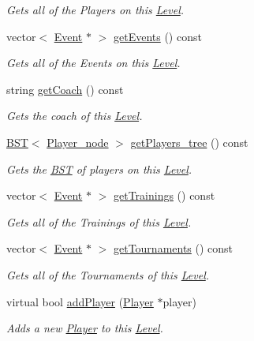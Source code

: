 \begin{DoxyCompactItemize}
\begin{DoxyCompactList}\small\item\em Gets all of the Players on this \hyperlink{class_level}{Level}. \end{DoxyCompactList}\item 
vector$<$ \hyperlink{class_event}{Event} $\ast$ $>$ \hyperlink{class_level_aa03432096cfcf42293cebf2c801b7437}{get\+Events} () const
\begin{DoxyCompactList}\small\item\em Gets all of the Events on this \hyperlink{class_level}{Level}. \end{DoxyCompactList}\item 
string \hyperlink{class_level_a6c4d3f153c3285aeaf3ec954981c5be8}{get\+Coach} () const
\begin{DoxyCompactList}\small\item\em Gets the coach of this \hyperlink{class_level}{Level}. \end{DoxyCompactList}\item 
\hyperlink{class_b_s_t}{B\+ST}$<$ \hyperlink{struct_player__node}{Player\+\_\+node} $>$ \hyperlink{class_level_ae24a0ba5c352e1cb0fa64282a89e559f}{get\+Players\+\_\+tree} () const
\begin{DoxyCompactList}\small\item\em Gets the \hyperlink{class_b_s_t}{B\+ST} of players on this \hyperlink{class_level}{Level}. \end{DoxyCompactList}\item 
vector$<$ \hyperlink{class_event}{Event} $\ast$ $>$ \hyperlink{class_level_a58a416953fdf79d4b6388cd6bd0b4e95}{get\+Trainings} () const
\begin{DoxyCompactList}\small\item\em Gets all of the Trainings of this \hyperlink{class_level}{Level}. \end{DoxyCompactList}\item 
vector$<$ \hyperlink{class_event}{Event} $\ast$ $>$ \hyperlink{class_level_a20beb75d82f194ad901e6193ee728d81}{get\+Tournaments} () const
\begin{DoxyCompactList}\small\item\em Gets all of the Tournaments of this \hyperlink{class_level}{Level}. \end{DoxyCompactList}\item 
virtual bool \hyperlink{class_level_a66290778fa4bcd2f29b9ff3e605b2902}{add\+Player} (\hyperlink{class_player}{Player} $\ast$player)
\begin{DoxyCompactList}\small\item\em Adds a new \hyperlink{class_player}{Player} to this \hyperlink{class_level}{Level}. \end{DoxyCompactList}\item 

\end{DoxyCompactItemize}
